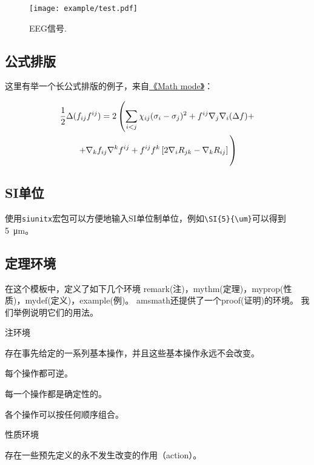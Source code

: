\begin{figure}[t]
\centering
    \texttt{[image: example/test.pdf]}
    \caption{EEG信号.}
\end{figure}

\subsection{公式排版}

这里有举一个长公式排版的例子，来自\href{http://www.tex.ac.uk/tex-archive/info/math/voss/mathmode/Mathmode.pdf}{《Math mode》}：

\begin {multline}
\frac {1}{2}\Delta (f_{ij}f^{ij})=
2\left (\sum _{i<j}\chi _{ij}(\sigma _{i}-
\sigma _{j}) ^{2}+ f^{ij}\nabla _{j}\nabla _{i}(\Delta f)+\right .\\
\left .+\nabla _{k}f_{ij}\nabla ^{k}f^{ij}+
f^{ij}f^{k}\left [2\nabla _{i}R_{jk}-
\nabla _{k}R_{ij}\right ]\vphantom {\sum _{i<j}}\right )
\end{multline}

\subsection{SI单位}

使用\verb+siunitx+宏包可以方便地输入SI单位制单位，例如\verb+\SI{5}{\um}+可以得到\SI{5}{\um}。

\subsection{定理环境}

在这个模板中，定义了如下几个环境
remark(注)，mythm(定理)，myprop(性质)，mydef(定义)，example(例)。
amsmath还提供了一个proof(证明)的环境。
我们举例说明它们的用法。

注环境
\begin{remark}
	存在事先给定的一系列基本操作，并且这些基本操作永远不会改变。
\end{remark}
\begin{remark}
	每个操作都可逆。
	\label{o1.2}
\end{remark}
\begin{remark}
	每一个操作都是确定性的。
\end{remark}
\begin{remark}
	各个操作可以按任何顺序组合。
\end{remark}

性质环境
\begin{myprop}{}{}
	存在一些预先定义的永不发生改变的作用（action）。
\end{myprop}

